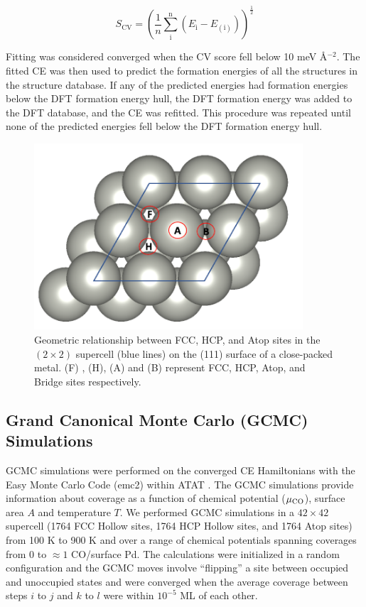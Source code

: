 \documentclass[11pt]{article}
\begin{document}
\begin{equation} \label{CVScore}
	S_\mathrm{CV} =  \left( \frac{1}{n} \sum_\mathrm{i}^\mathrm{n} \left( E_\mathrm{i} - E_{(\mathrm{i})} \right) \right) ^ { \frac{1}{2}}
\end{equation}

Fitting was considered converged when the CV score fell below 10 meV \AA$^{-2}$. The fitted CE was then used to predict the formation energies of all the structures in the structure database.  If any of the predicted energies had formation energies below the DFT formation energy hull, the DFT formation energy was added to the DFT database, and the CE was refitted. This procedure was repeated until none of the predicted energies fell below the DFT formation energy hull.

\begin{figure} [ht]
	\centering
	\includegraphics[width=10cm]{Figure/Pd.pdf}
	\caption{Geometric relationship between FCC, HCP, and Atop sites in the $(2 \times 2)$ supercell (blue lines) on the (111) surface of a close-packed metal. (F) , (H), (A) and (B) represent FCC, HCP,  Atop, and Bridge sites respectively.}
	\label{Pd}
\end{figure}

\subsection{Grand Canonical Monte Carlo (GCMC) Simulations} \label{GCMC_sec}
GCMC simulations were performed on the converged CE Hamiltonians with the Easy Monte Carlo Code (emc2) within ATAT \cite{VandeWalle2002}. The GCMC simulations provide information about coverage as a function of chemical potential ($\mu_{\ce{CO}}$), surface area $A$ and temperature $T$.  We performed GCMC simulations in a $42 \times 42$ supercell (1764 FCC Hollow sites, 1764 HCP Hollow sites, and 1764 Atop sites) from 100 K to 900 K and over a range of chemical potentials spanning coverages from 0 to $\approx 1$ CO/surface Pd. The calculations were initialized in a random configuration and the GCMC moves involve ``flipping'' a site between occupied and unoccupied states and were converged when the average coverage between steps $i$ to $j$ and $k$ to $l$ were within $10^{-5}$ ML of each other.
\end{document}
